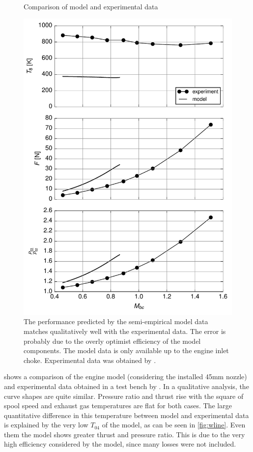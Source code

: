 \begin{figure}
    \caption{Comparison of model and experimental data}
    \label{fig:experimental}
    \includegraphics{fig/experimental}
    \source{\authorsfigure}
    \caption*{The performance predicted by the semi-empirical model data matches qualitatively well with the experimental data. The error is probably due to the overly optimist efficiency of the model components. The model data is only available up to the engine inlet choke. Experimental data was obtained by \textcite{bolsoni_test}.}
\end{figure}

 shows a comparison of the engine model (considering the installed 45mm nozzle) and experimental data obtained in a test bench by \textcite{bolsoni_test}. In a qualitative analysis, the curve shapes are quite similar. Pressure ratio and thrust rise with the square of spool speed and exhaust gas temperatures are flat for both cases. The large quantitative difference in this temperature between model and experimental data is explained by the very low $T_{04}$ of the model, as can be seen in \cref{fig:wline}. Even them the model shows greater thrust and pressure ratio. This is due to the very high efficiency considered by the model, since many losses were not included.

